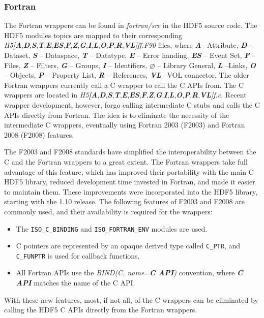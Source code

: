 \subsubsection{Fortran\label{subsec:Fortran}}

The Fortran wrappers can be found in \textit{fortran/src} in the HDF5 source code. The HDF5 modules topics are mapped to their corresponding
\emph{H5{[}}\textbf{\textsl{A}},\textbf{\textsl{D}},\textbf{\textsl{S}},\textbf{\textsl{T}},\textbf{\textsl{E}},\textbf{\textsl{ES}},\textbf{\textsl{F}},\textbf{\textsl{Z}},\textbf{\textsl{G}},\textbf{\textsl{I}},\textbf{\textsl{L}},\textbf{\textsl{O}},\textbf{\textsl{P}},\textbf{\textsl{R}},\textbf{\textsl{VL}}\emph{{]}ff.F90} files, where \textbf{\textsl{A}}-- Attribute, \textbf{\textsl{D}} -- Dataset, \textbf{\textsl{S}} -- Dataspace, \textbf{\textsl{T}}
-- Datatype, \textbf{\textsl{E}} -- Error handing, \textbf{\textsl{ES}} -- Event Set, \textbf{\textsl{F}} -- Files, \textbf{\textsl{Z}} -- Filters, \textbf{\textsl{G}} -- Groups, \textbf{\textsl{I}} -- Identifiers,  $\varnothing$ -- Library General, \textbf{\textsl{L}} --Links, \textbf{\textsl{O}} -- Objects, \textbf{\textsl{P}} -- Property
List, \textbf{\textsl{R}} -- References, \textbf{\textsl{VL}} --VOL connector. The older Fortran wrappers currently call a C wrapper
to call the C APIs from. The C wrappers are located in \emph{H5}\textbf{\textsl{{[}A}},\textbf{\textsl{D}},\textbf{\textsl{S}},\textbf{\textsl{T}},\textbf{\textsl{E}},\textbf{\textsl{ES}},\textbf{\textsl{F}},\textbf{\textsl{Z}},\textbf{\textsl{G}},\textbf{\textsl{I}},\textbf{\textsl{L}},\textbf{\textsl{O}},\textbf{\textsl{P}},\textbf{\textsl{R}},\textbf{\textsl{VL}}\emph{{]}f.c}.
Recent wrapper development, however, forgo calling intermediate C stubs and calls the C APIs directly from Fortran. The idea is to eliminate the necessity of the intermediate C wrappers, eventually using Fortran 2003 (F2003) and Fortran 2008 (F2008) features.

The F2003 and F2008 standards have simplified the interoperability between the C and the Fortran wrappers to a great extent. The Fortran wrappers take full advantage of this feature, which has improved their portability with the main C HDF5 library, reduced development time invested in Fortran, and made it easier to maintain them. These improvements were incorporated into the HDF5 library, starting with the 1.10 release.
The following features of F2003 and F2008 are commonly used, and their availability is required for the wrappers:
\begin{itemize}
    \item The \texttt{ISO\_C\_BINDING} and \texttt{ISO\_FORTRAN\_ENV} modules are used.
    \item C pointers are represented by an opaque derived type called \texttt{C\_PTR}, and \texttt{C\_FUNPTR} is used for callback functions.
    \item All Fortran APIs use the \textit{BIND(C, name=\textbf{C API})} convention, where \textit{\textbf{C API}} matches the name of the C API.
\end{itemize}
With these new features, most, if not all, of the C wrappers can be eliminated by calling the HDF5 C APIs directly from the Fortran wrappers.


